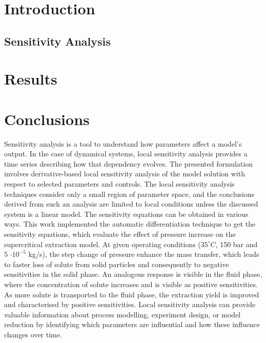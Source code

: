 \documentclass[a4paper,fleqn]{cas-dc}
\begin{document}

\section{Introduction}








\subsection{Sensitivity Analysis} \label{CH: Sensitivity_Analysis}



\section{Results}


\section{Conclusions} \label{CH: Conclusion}

Sensitivity analysis is a tool to understand how parameters affect a model's output. In the case of dynamical systems, local sensitivity analysis provides a time series describing how that dependency evolves. The presented formulation involves derivative-based local sensitivity analysis of the model solution with respect to selected parameters and controls. The local sensitivity analysis techniques consider only a small region of parameter space, and the conclusions derived from such an analysis are limited to local conditions unless the discussed system is a linear model. The sensitivity equations can be obtained in various ways. This work implemented the automatic differentiation technique to get the sensitivity equations, which evaluate the effect of pressure increase on the supercritical extraction model. At given operating conditions ($35^\circ C$, 150 bar and 5 $\cdot 10^{-5}$ kg/s), the step change of pressure enhance the mass transfer, which leads to faster loss of solute from solid particles and consequently to negative sensitivities in the solid phase. An analogous response is visible in the fluid phase, where the concentration of solute increases and is visible as positive sensitivities. As more solute is transported to the fluid phase, the extraction yield is improved and characterised by positive sensitivities. Local sensitivity analysis can provide valuable information about process modelling, experiment design, or model reduction by identifying which parameters are influential and how these influence changes over time.
\end{document}
